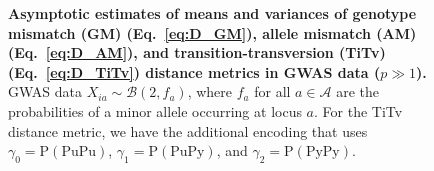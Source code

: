 \documentclass[10pt,letterpaper]{article}
\begin{document}
%

\begin{figure}[H]
	\centering
	\caption{{\bf Asymptotic estimates of means and variances of genotype mismatch (GM) (Eq.~\ref{eq:D_GM}), allele mismatch (AM) (Eq.~\ref{eq:D_AM}), and transition-transversion (TiTv) (Eq.~\ref{eq:D_TiTv}) distance metrics in GWAS data ($p \gg 1$).} GWAS data $X_{ia} \sim \mathcal{B}(2,f_a)$, where $f_a$ for all $a \in \mathcal{A}$ are the probabilities of a minor allele occurring at locus $a$. For the TiTv distance metric, we have the additional encoding that uses $\gamma_0=\text{P}(\text{PuPu})$, $\gamma_1=\text{P}(\text{PuPy})$, and $\gamma_2=\text{P}(\text{PyPy})$.}
	\label{tab:dist_distr_gwas}
\end{figure}
\end{document}
